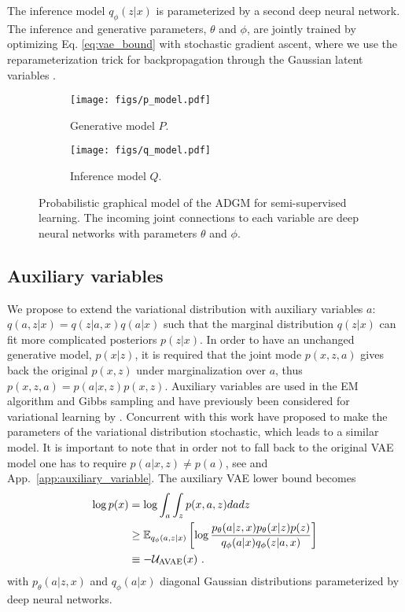 \documentclass{article}
\begin{document}
The inference model $q_\phi(z|x)$ is parameterized by a second deep neural network. The inference and generative parameters, $\theta$ and $\phi$, are jointly trained by optimizing Eq. \ref{eq:vae_bound} with stochastic gradient ascent, where we use the reparameterization trick for backpropagation through the Gaussian latent variables \citep{Kingma13,Rezende14}.

\begin{figure}[h!]
  \centering
  	\begin{subfigure}{.22\textwidth}
	  \centering
      \texttt{[image: figs/p\_model.pdf]}
	  \caption{Generative model $P$.}
	  \label{fig:p_model}
	\end{subfigure}
	\begin{subfigure}{.22\textwidth}
	  \centering
      \texttt{[image: figs/q\_model.pdf]}
	  \caption{Inference model $Q$.}
	  \label{fig:q_model}
	\end{subfigure}
     \vspace{-3mm}
	\caption{Probabilistic graphical model of the ADGM for semi-supervised learning. The incoming joint connections to each variable are deep neural networks with parameters $\theta$ and $\phi$.}
    \vspace{-4mm}
  \label{fig:models}
\end{figure}

\subsection{Auxiliary variables} \label{sec:aux}
We propose to extend the variational distribution with auxiliary variables $a$: $q(a,z|x)=q(z|a,x)q(a|x)$ such that the marginal distribution $q(z|x)$ can fit more complicated posteriors $p(z|x)$. In order to have an unchanged generative model, $p(x|z)$, it is required that the joint mode $p(x,z,a)$ gives back the original $p(x,z)$ under marginalization over $a$, thus $p(x,z,a)=p(a|x,z)p(x,z)$. Auxiliary variables are used in the EM algorithm and Gibbs sampling and have previously been considered for variational learning by \citet{Agakov04}. Concurrent with this work \citet{Ranganath2015} have proposed to make the parameters of the variational distribution stochastic, which leads to a similar model. It is important to note that in order not to fall back to the original VAE model one has to require $p(a|x,z)\neq p(a)$, see \citet{Agakov04} and App.~\ref{app:auxiliary_variable}. The auxiliary VAE lower bound becomes 
\begin{align}\label{eq:avae_bound}
\log p(x) &= \log \int_a \int_z p(x, a, z) dadz \nonumber \\
&\ge \mathbb{E}_{q_\phi(a,z|x)}
\left[ \log
\frac{p_\theta(a|z,x) p_\theta(x|z)p(z)}{  q_\phi(a|x)q_\phi(z|a,x)} 
\right]\\
&\equiv - {\cal U}_{\text{AVAE}}(x)\ . \nonumber
\end{align}
with $p_\theta(a|z,x)$ and $q_\phi(a|x)$ diagonal Gaussian distributions parameterized by deep neural networks.
\end{document}
